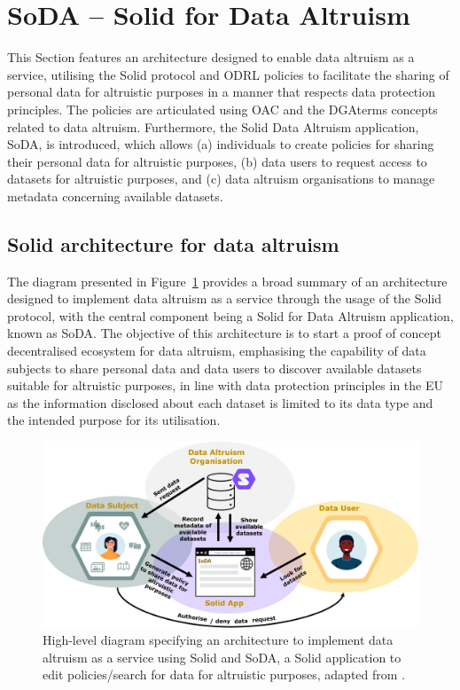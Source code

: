 \section{SoDA -- Solid for Data Altruism}
\label{sec:soda}

This Section features an architecture designed to enable data altruism as a service, utilising the Solid protocol and ODRL policies to facilitate the sharing of personal data for altruistic purposes in a manner that respects data protection principles.
The policies are articulated using OAC and the DGAterms concepts related to data altruism.
Furthermore, the Solid Data Altruism application, SoDA, is introduced, which allows (a) individuals to create policies for sharing their personal data for altruistic purposes, (b) data users to request access to datasets for altruistic purposes, and (c) data altruism organisations to manage metadata concerning available datasets.

\subsection{Solid architecture for data altruism}
\label{sec:architecture_soda}

The diagram presented in Figure~\ref{fig:soda_architecture} provides a broad summary of an architecture designed to implement data altruism as a service through the usage of the Solid protocol, with the central component being a Solid for Data Altruism application, known as SoDA.
The objective of this architecture is to start a proof of concept decentralised ecosystem for data altruism, emphasising the capability of data subjects to share personal data and data users to discover available datasets suitable for altruistic purposes, in line with data protection principles in the EU as the information disclosed about each dataset is limited to its data type and the intended purpose for its utilisation.

\begin{figure}[ht]
  \centering
  \includegraphics[width=\linewidth]{figures/chapter-7/architecture.png}
  \caption[SoDA architecture diagram.]{High-level diagram specifying an architecture to implement data altruism as a service using Solid and SoDA, a Solid application to edit policies/search for data for altruistic purposes, adapted from \cite{esteves_towards_2023}.}
  \label{fig:soda_architecture}
\end{figure}

